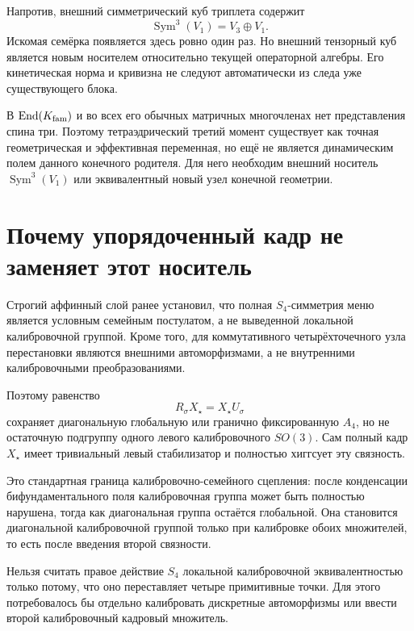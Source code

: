Напротив, внешний симметрический куб триплета содержит
\begin{equation}
 \operatorname{Sym}^3(V_1)=V_3\oplus V_1.
 \label{eq:v6-external-symmetric-cube}
\end{equation}
Искомая семёрка появляется здесь ровно один раз. Но внешний тензорный куб
является новым носителем относительно текущей операторной алгебры. Его
кинетическая норма и кривизна не следуют автоматически из следа уже
существующего блока.

\begin{theorem}
В $\operatorname{End}(K_{\rm fam})$ и во всех его обычных матричных многочленах нет
представления спина три. Поэтому тетраэдрический третий момент существует
как точная геометрическая и эффективная переменная, но ещё не является
динамическим полем данного конечного родителя. Для него необходим внешний
носитель $\operatorname{Sym}^3(V_1)$ или эквивалентный новый узел конечной геометрии.
\end{theorem}

\section{Почему упорядоченный кадр не заменяет этот носитель}

Строгий аффинный слой ранее установил, что полная $S_4$-симметрия меню
является условным семейным постулатом, а не выведенной локальной
калибровочной группой. Кроме того, для коммутативного четырёхточечного
узла перестановки являются внешними автоморфизмами, а не внутренними
калибровочными преобразованиями.

Поэтому равенство
\begin{equation}
 R_\sigma X_\star=X_\star U_\sigma
\end{equation}
сохраняет диагональную глобальную или гранично фиксированную $A_4$, но не
остаточную подгруппу одного левого калибровочного $SO(3)$. Сам полный кадр
$X_\star$ имеет тривиальный левый стабилизатор и полностью хиггсует эту
связность.

Это стандартная граница калибровочно-семейного сцепления: после
конденсации бифундаментального поля калибровочная группа может быть
полностью нарушена, тогда как диагональная группа остаётся глобальной.
Она становится диагональной калибровочной группой только при калибровке
обоих множителей, то есть после введения второй связности.

\begin{nogocriterion}
Нельзя считать правое действие $S_4$ локальной калибровочной
эквивалентностью только потому, что оно переставляет четыре примитивные
точки. Для этого потребовалось бы отдельно калибровать дискретные
автоморфизмы или ввести второй калибровочный кадровый множитель.
\end{nogocriterion}

